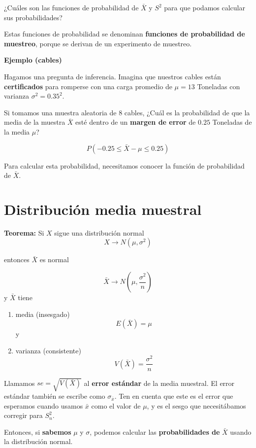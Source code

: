 \documentclass[
]{book}
\begin{document}
¿Cuáles son las funciones de probabilidad de \(\bar{X}\) y \(S^2\) para que podamos calcular sus probabilidades?

Estas funciones de probabilidad se denominan \textbf{funciones de probabilidad de muestreo}, porque se derivan de un experimento de muestreo.

\textbf{Ejemplo (cables)}

Hagamos una pregunta de inferencia. Imagina que nuestros cables están \textbf{certificados} para romperse con una carga promedio de \(\mu = 13\) Toneladas con varianza \(\sigma^2=0.35^2\).

Si tomamos una muestra aleatoria de \(8\) cables, ¿Cuál es la probabilidad de que la media de la muestra \(\bar{X}\) esté dentro de un \textbf{margen de error} de \(0.25\) Toneladas de la media \(\mu\)?

\[P(- 0.25\leq \bar{X}-\mu \leq 0.25)\]

Para calcular esta probabilidad, necesitamos conocer la función de probabilidad de \(\bar{X}\).

\hypertarget{distribuciuxf3n-media-muestral}{%
\section{Distribución media muestral}\label{distribuciuxf3n-media-muestral}}

\textbf{Teorema:} Si \(X\) sigue una distribución normal \[X \rightarrow N(\mu, \sigma^2)\]

entonces \(\bar{X}\) es normal

\[\bar{X} \rightarrow N(\mu, \frac{\sigma^2}{n})\]
y \(\bar{X}\) tiene

\begin{enumerate}
\def\labelenumi{\arabic{enumi})}
\item
  media (insesgado)
  \[E(\bar{X})=\mu\]
  y
\item
  varianza (consistente)
  \[V(\bar{X})=\frac{\sigma^2}{n}\]
\end{enumerate}

Llamamos \(se=\sqrt{V(\bar{X})}\) al \textbf{error estándar} de la media muestral. El error estándar también se escribe como \(\sigma_{\bar{x}}\). Ten en cuenta que este es el error que esperamos cuando usamos \(\bar{x}\) como el valor de \(\mu\), y es el sesgo que necesitábamos corregir para \(S_n^2\).

Entonces, si \textbf{sabemos} \(\mu\) y \(\sigma\), podemos calcular las \textbf{probabilidades de} \(\bar{X}\) usando la distribución normal.
\end{document}
